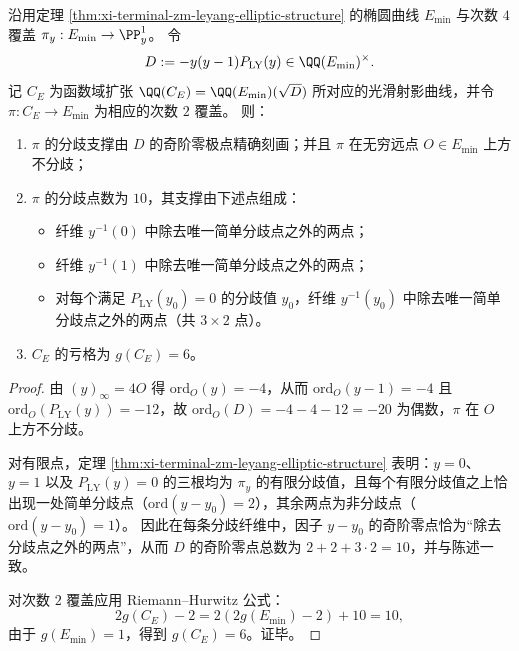 \par


\begin{corollary}\label{cor:xi-terminal-zm-leyang-discriminant-square-root-basechange-genus6}
沿用定理 \ref{thm:xi-terminal-zm-leyang-elliptic-structure} 的椭圆曲线 \(E_{\min}\) 与次数 \(4\) 覆盖 \(\pi_y:E_{\min}\to\PP^{1}_{y}\)。
令
\[
D:=-y(y-1)P_{\mathrm{LY}}(y)\in \QQ(E_{\min})^{\times}.
\]
记 \(C_{E}\) 为函数域扩张
\(
\QQ(C_{E})=\QQ(E_{\min})(\sqrt{D})
\)
所对应的光滑射影曲线，并令 \(\pi:C_{E}\to E_{\min}\) 为相应的次数 \(2\) 覆盖。
则：
\begin{enumerate}
  \item \(\pi\) 的分歧支撑由 \(D\) 的奇阶零极点精确刻画；并且 \(\pi\) 在无穷远点 \(O\in E_{\min}\) 上方不分歧；
  \item \(\pi\) 的分歧点数为 \(10\)，其支撑由下述点组成：
  \begin{itemize}
    \item 纤维 \(y^{-1}(0)\) 中除去唯一简单分歧点之外的两点；
    \item 纤维 \(y^{-1}(1)\) 中除去唯一简单分歧点之外的两点；
    \item 对每个满足 \(P_{\mathrm{LY}}(y_0)=0\) 的分歧值 \(y_0\)，纤维 \(y^{-1}(y_0)\) 中除去唯一简单分歧点之外的两点（共 \(3\times 2\) 点）。
  \end{itemize}
  \item \(C_{E}\) 的亏格为 \(g(C_{E})=6\)。
\end{enumerate}
\end{corollary}
\begin{proof}
由 \((y)_\infty=4O\) 得 \(\mathrm{ord}_{O}(y)=-4\)，从而 \(\mathrm{ord}_{O}(y-1)=-4\) 且 \(\mathrm{ord}_{O}(P_{\mathrm{LY}}(y))=-12\)，故
\(
\mathrm{ord}_{O}(D)=-4-4-12=-20
\)
为偶数，\(\pi\) 在 \(O\) 上方不分歧。
\par
对有限点，定理 \ref{thm:xi-terminal-zm-leyang-elliptic-structure} 表明：\(y=0\)、\(y=1\) 以及 \(P_{\mathrm{LY}}(y)=0\) 的三根均为 \(\pi_y\) 的有限分歧值，且每个有限分歧值之上恰出现一处简单分歧点（\(\mathrm{ord}(y-y_0)=2\)），其余两点为非分歧点（\(\mathrm{ord}(y-y_0)=1\)）。
因此在每条分歧纤维中，因子 \(y-y_0\) 的奇阶零点恰为“除去分歧点之外的两点”，从而 \(D\) 的奇阶零点总数为
\(
2+2+3\cdot 2=10
\)，并与陈述一致。
\par
对次数 \(2\) 覆盖应用 Riemann--Hurwitz 公式：
\[
2g(C_{E})-2
=2(2g(E_{\min})-2)+10
=10,
\]
由于 \(g(E_{\min})=1\)，得到 \(g(C_{E})=6\)。证毕。
\end{proof}
